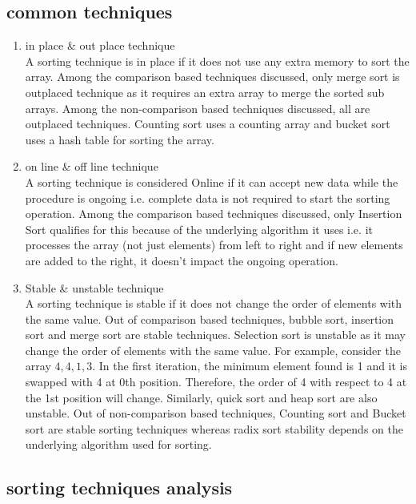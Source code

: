 \documentclass[
10pt, %
a4paper, %
oneside, %
headinclude,footinclude, %
BCOR5mm, %
]{scrartcl}
\begin{document}

\subsection{common techniques}
\begin{enumerate}[noitemsep]
\item in place \& out place technique
\\
A sorting technique is in place if it does not use any extra memory to sort the array. 
Among the comparison based techniques discussed, only merge sort is outplaced technique as it requires an extra array to merge the sorted sub arrays. 
Among the non-comparison based techniques discussed, all are outplaced techniques. Counting sort uses a counting array and bucket sort uses a hash table for sorting the array. 

\item on line \& off line technique
\\
A sorting technique is considered Online if it can accept new data while the procedure is ongoing i.e. complete data is not required to start the sorting operation. 
Among the comparison based techniques discussed, only Insertion Sort qualifies for this because of the underlying algorithm it uses i.e. it processes the array (not just elements) from left to right and if new elements are added to the right, it doesn’t impact the ongoing operation. 

\item Stable \& unstable technique
\\
A sorting technique is stable if it does not change the order of elements with the same value. 
Out of comparison based techniques, bubble sort, insertion sort and merge sort are stable techniques. Selection sort is unstable as it may change the order of elements with the same value. For example, consider the array $4, 4, 1, 3.$ 
In the first iteration, the minimum element found is 1 and it is swapped with 4 at 0th position. Therefore, the order of 4 with respect to 4 at the 1st position will change. Similarly, quick sort and heap sort are also unstable. 
Out of non-comparison based techniques, Counting sort and Bucket sort are stable sorting techniques whereas radix sort stability depends on the underlying algorithm used for sorting. 
\end{enumerate}



\subsection{sorting techniques analysis}
\end{document}
